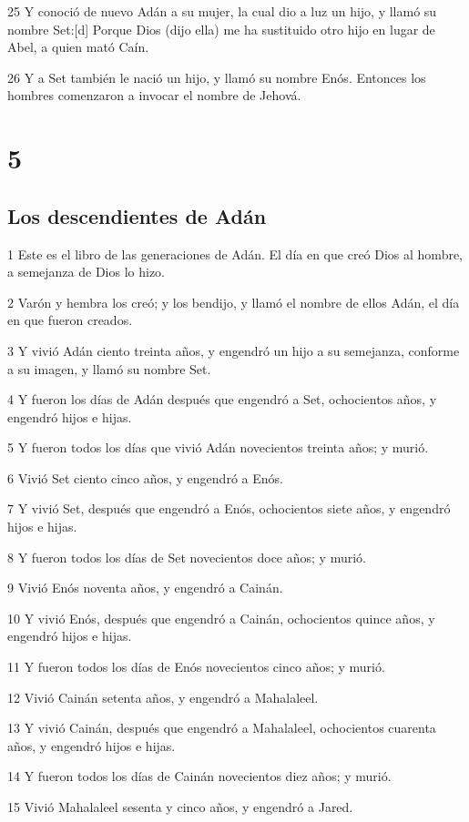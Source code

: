 25 Y conoció de nuevo Adán a su mujer, la cual dio a luz un hijo, y llamó su nombre Set:[d] Porque Dios (dijo ella) me ha sustituido otro hijo en lugar de Abel, a quien mató Caín.

26 Y a Set también le nació un hijo, y llamó su nombre Enós. Entonces los hombres comenzaron a invocar el nombre de Jehová.

\chapter{5}

\section{Los descendientes de Adán}

1 Este es el libro de las generaciones de Adán. El día en que creó Dios al hombre, a semejanza de Dios lo hizo.

2 Varón y hembra los creó; y los bendijo, y llamó el nombre de ellos Adán, el día en que fueron creados.

3 Y vivió Adán ciento treinta años, y engendró un hijo a su semejanza, conforme a su imagen, y llamó su nombre Set.

4 Y fueron los días de Adán después que engendró a Set, ochocientos años, y engendró hijos e hijas.

5 Y fueron todos los días que vivió Adán novecientos treinta años; y murió.

6 Vivió Set ciento cinco años, y engendró a Enós.

7 Y vivió Set, después que engendró a Enós, ochocientos siete años, y engendró hijos e hijas.

8 Y fueron todos los días de Set novecientos doce años; y murió.

9 Vivió Enós noventa años, y engendró a Cainán.

10 Y vivió Enós, después que engendró a Cainán, ochocientos quince años, y engendró hijos e hijas.

11 Y fueron todos los días de Enós novecientos cinco años; y murió.

12 Vivió Cainán setenta años, y engendró a Mahalaleel.

13 Y vivió Cainán, después que engendró a Mahalaleel, ochocientos cuarenta años, y engendró hijos e hijas.

14 Y fueron todos los días de Cainán novecientos diez años; y murió.

15 Vivió Mahalaleel sesenta y cinco años, y engendró a Jared.

